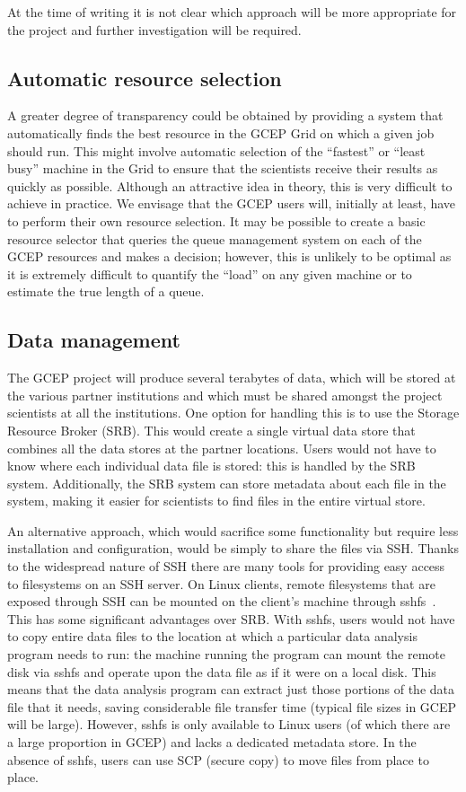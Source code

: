 \documentclass[a4paper]{article}
\begin{document}
\begin{multicols}{2}
At the time of writing it is not clear which approach will be more appropriate for the project and further investigation will be required.

\subsection{Automatic resource selection}
A greater degree of transparency could be obtained by providing a system that automatically finds the best resource in the GCEP Grid on which a given job should run.  This might involve automatic selection of the ``fastest'' or ``least busy'' machine in the Grid to ensure that the scientists receive their results as quickly as possible.  Although an attractive idea in theory, this is very difficult to achieve in practice.  We envisage that the GCEP users will, initially at least, have to perform their own resource selection.  It may be possible to create a basic resource selector that queries the queue management system on each of the GCEP resources and makes a decision; however, this is unlikely to be optimal as it is extremely difficult to quantify the ``load'' on any given machine or to estimate the true length of a queue.

\subsection{Data management}\label{sec:datamanagement}
The GCEP project will produce several terabytes of data, which will be stored at the various partner institutions and which must be shared amongst the project scientists at all the institutions.  One option for handling this is to use the Storage Resource Broker (SRB).  This would create a single virtual data store that combines all the data stores at the partner locations.  Users would not have to know where each individual data file is stored: this is handled by the SRB system.  Additionally, the SRB system can store metadata about each file in the system, making it easier for scientists to find files in the entire virtual store.

An alternative approach, which would sacrifice some functionality but require less installation and configuration, would be simply to share the files via SSH.  Thanks to the widespread nature of SSH there are many tools for providing easy access to filesystems on an SSH server.  On Linux clients, remote filesystems that are exposed through SSH can be mounted on the client's machine through sshfs~\cite{sshfs}.  This has some significant advantages over SRB.  With sshfs, users would not have to copy entire data files to the location at which a particular data analysis program needs to run: the machine running the program can mount the remote disk via sshfs and operate upon the data file as if it were on a local disk.  This means that the data analysis program can extract just those portions of the data file that it needs, saving considerable file transfer time (typical file sizes in GCEP will be large).  However, sshfs is only available to Linux users (of which there are a large proportion in GCEP) and lacks a dedicated metadata store.  In the absence of sshfs, users can use SCP (secure copy) to move files from place to place.


\end{multicols}
\end{document}
